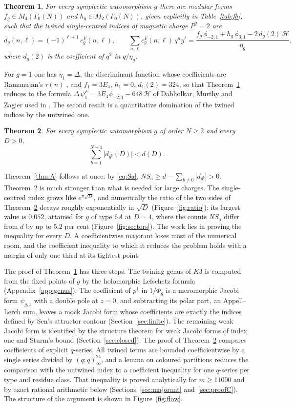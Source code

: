 \documentclass[11pt]{amsart}
\newtheorem{mainthm}{Theorem}
\theoremstyle{definition}
\newcommand{\cH}{\mathcal H}
\begin{document}
\begin{mainthm}\label{thm:B}
For every symplectic automorphism $g$ there are modular forms $f_g\in M_4(\Gamma_0(N))$ and $h_g\in M_2(\Gamma_0(N))$, given explicitly in Table~\ref{tab:fh}, such that the twined single-centred indices of magnetic charge $P^2=2$ are
\[
d_g(n,\ell)=(-1)^{\ell+1}\,c^F_g(n,\ell),\qquad
\sum_{n,\ell}c^F_g(n,\ell)\,q^ny^\ell=\frac{f_g\,\phi_{-2,1}+h_g\,\phi_{0,1}-2\,d_g(2)\,\cH}{\eta_g},
\]
where $d_g(2)$ is the coefficient of $q^2$ in $q/\eta_g$.
\end{mainthm}

For $g=1$ one has $\eta_1=\Delta$, the discriminant function whose coefficients are Ramanujan's $\tau(n)$ \cite{Zag08,BBS23}, and $f_1=3E_4$, $h_1=0$, $d_1(2)=324$, so that Theorem~\ref{thm:B} reduces to the formula $\Delta\,\psi^F_1=3E_4\phi_{-2,1}-648\,\cH$ of Dabholkar, Murthy and Zagier used in \cite{BM13}. The second result is a quantitative domination of the twined indices by the untwined one.

\begin{mainthm}\label{thm:C}
For every symplectic automorphism $g$ of order $N\ge2$ and every $D>0$,
\[
\sum_{b=1}^{N-1}\bigl|d_{g^b}(D)\bigr|<d(D).
\]
\end{mainthm}

Theorem~\ref{thm:A} follows at once: by \eqref{eq:Sa}, $N S_a\ge d-\sum_{b\ne0}|d_{g^b}|>0$. Theorem~\ref{thm:C} is much stronger than what is needed for large charges. The single-centred index grows like $e^{\pi\sqrt D}$, and numerically the ratio of the two sides of Theorem~\ref{thm:C} decays roughly exponentially in $\sqrt D$ (Figure~\ref{fig:ratio}); its largest value is $0.052$, attained for $g$ of type $6A$ at $D=4$, where the counts $N S_a$ differ from $d$ by up to $5.2$ per cent (Figure~\ref{fig:sectors}). The work lies in proving the inequality for every $D$. A coefficientwise majorant loses most of the numerical room, and the coefficient inequality to which it reduces the problem holds with a margin of only one third at its tightest point.

The proof of Theorem~\ref{thm:B} has three steps. The twining genus of $K3$ is computed from the fixed points of $g$ by the holomorphic Lefschetz formula (Appendix~\ref{app:genus}). The coefficient of $p^1$ in $1/\Phi_g$ is a meromorphic Jacobi form $\psi_{g,1}$ with a double pole at $z=0$, and subtracting its polar part, an Appell--Lerch sum, leaves a mock Jacobi form whose coefficients are exactly the indices defined by Sen's attractor contour (Section~\ref{sec:finite}). The remaining weak Jacobi form is identified by the structure theorem for weak Jacobi forms of index one and Sturm's bound (Section~\ref{sec:closed}). The proof of Theorem~\ref{thm:C} compares coefficients of explicit $q$-series. All twined terms are bounded coefficientwise by a single series divided by $(q;q)_\infty^{24}$, and a lemma on coloured partitions reduces the comparison with the untwined index to a coefficient inequality for one $q$-series per type and residue class. That inequality is proved analytically for $m\ge 11000$ and by exact rational arithmetic below (Sections~\ref{sec:majorant} and~\ref{sec:proofC}). The structure of the argument is shown in Figure~\ref{fig:flow}.
\end{document}
